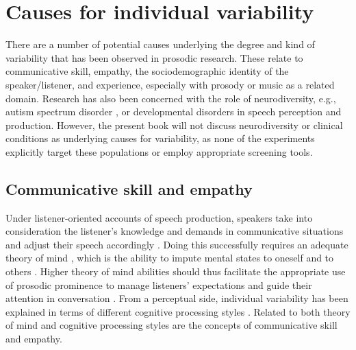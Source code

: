 \section{Causes for individual variability} \label{sec:causes_variability}

There are a number of potential causes underlying the degree and kind of variability that has been observed in prosodic research. These relate to communicative skill, empathy, the sociodemographic identity of the speaker/listener, and experience, especially with prosody or music as a related domain. Research has also been concerned with the role of neurodiversity, e.g., autism spectrum disorder \citep{wehrleConversationIntonationAutism2023}, or developmental disorders \citep{schwartzSpeechPerceptionLexical2013} in speech perception and production. However, the present book will not discuss neurodiversity or clinical conditions as underlying causes for variability, as none of the experiments explicitly target these populations or employ appropriate screening tools.

\subsection{Communicative skill and empathy}

Under listener-oriented accounts of speech production, speakers take into consideration the listener's knowledge and demands in communicative situations and adjust their speech accordingly \citep[e.g.,][]{lindblomExplainingPhoneticVariation1990}. Doing this successfully requires an adequate theory of mind \citep{turnbullListenerorientedPhoneticReduction2019}, which is the ability to impute mental states to oneself and to others \citep{premackDoesChimpanzeeHave1978}. Higher theory of mind abilities should thus facilitate the appropriate use of prosodic prominence to manage listeners' expectations and guide their attention in conversation \citep{turnbullListenerorientedPhoneticReduction2019}. From a perceptual side, individual variability has been explained in terms of different cognitive processing styles \citep{bishopPhonologyPhoneticsSignalextrinsic2020, yuIndividualDifferencesLanguage2019}.
 Related to both theory of mind and cognitive processing styles are the concepts of communicative skill and empathy. 
 
